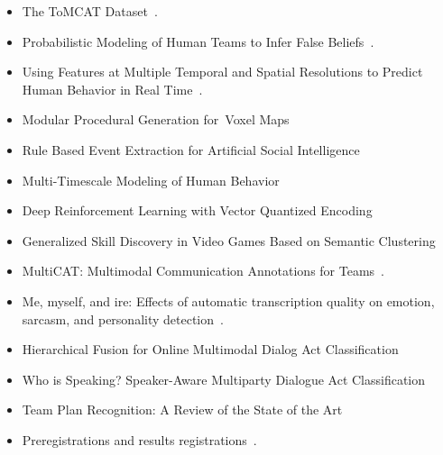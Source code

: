 \documentclass[11pt,article,oneside]{memoir}
\begin{document}
\begin{itemize}
    \item The ToMCAT Dataset~\citep{pyarelal2023the}.
    \item Probabilistic Modeling of Human Teams to Infer False
        Beliefs~\citep{Soares.ea:2021}.
    \item Using Features at Multiple Temporal and Spatial Resolutions to
        Predict Human Behavior in Real Time~\citep{Zhang.ea:2022c}.
    \item Modular Procedural Generation for Voxel Maps~\citep{Pyarelal.ea:2022}
    \item Rule Based Event Extraction for Artificial Social
        Intelligence~\citep{nitschke-etal-2022-rule}
    \item Multi-Timescale Modeling of Human Behavior~\citep{Basavaraj.ea:2022}
    \item Deep Reinforcement Learning with Vector Quantized
        Encoding~\citep{Zhang.ea:2022a}
    \item Generalized Skill Discovery in Video Games Based on Semantic
        Clustering~\citep{Zhang.ea:2022b}
    \item MultiCAT: Multimodal Communication Annotations for
        Teams~\citep{Culnan.ea:2023}.
    \item Me, myself, and ire: Effects of automatic transcription quality on
        emotion, sarcasm, and personality
        detection~\citep{culnan-etal-2021-ire}.
    \item Hierarchical Fusion for Online Multimodal Dialog Act
        Classification~\citep{miah2023hierarchical}
    \item Who is Speaking? Speaker-Aware Multiparty Dialogue Act
        Classification~\citep{qamar2023who}
    \item Team Plan Recognition: A Review of the State of the Art~\citep{Rieffer_Champlin_2023}
    \item Preregistrations and results
        registrations~\citep{study_1_preregistration_and_results,
        study_2_preregistration, study_2_results, study_3_preregistration,
    study_3_results}.

\end{itemize}


\newpage
\printbibliography
\end{document}
